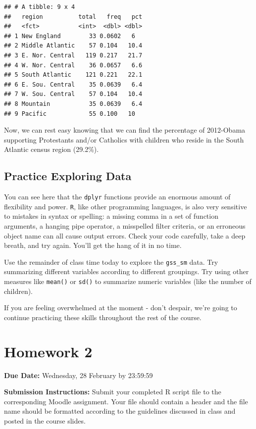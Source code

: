 \documentclass[
]{book}
\begin{document}
\begin{verbatim}
## # A tibble: 9 x 4
##   region          total   freq   pct
##   <fct>           <int>  <dbl> <dbl>
## 1 New England        33 0.0602   6  
## 2 Middle Atlantic    57 0.104   10.4
## 3 E. Nor. Central   119 0.217   21.7
## 4 W. Nor. Central    36 0.0657   6.6
## 5 South Atlantic    121 0.221   22.1
## 6 E. Sou. Central    35 0.0639   6.4
## 7 W. Sou. Central    57 0.104   10.4
## 8 Mountain           35 0.0639   6.4
## 9 Pacific            55 0.100   10
\end{verbatim}

Now, we can rest easy knowing that we can find the percentage of 2012-Obama supporting Protestants and/or Catholics with children who reside in the South Atlantic census region (29.2\%).

\hypertarget{practice-exploring-data}{%
\section{Practice Exploring Data}\label{practice-exploring-data}}

You can see here that the \texttt{dplyr} functions provide an enormous amount of flexibility and power. \texttt{R}, like other programming languages, is also very sensitive to mistakes in syntax or spelling: a missing comma in a set of function arguments, a hanging pipe operator, a misspelled filter criteria, or an erroneous object name can all cause output errors. Check your code carefully, take a deep breath, and try again. You'll get the hang of it in no time.

Use the remainder of class time today to explore the \texttt{gss\_sm} data. Try summarizing different variables according to different groupings. Try using other measures like \texttt{mean()} or \texttt{sd()} to summarize numeric variables (like the number of children).

If you are feeling overwhelmed at the moment - don't despair, we're going to continue practicing these skills throughout the rest of the course.

\hypertarget{homework-2}{%
\chapter*{Homework 2}\label{homework-2}}

\textbf{Due Date:} Wednesday, 28 February by 23:59:59

\textbf{Submission Instructions:} Submit your completed R script file to the corresponding Moodle assignment. Your file should contain a header and the file name should be formatted according to the guidelines discussed in class and posted in the course slides.
\end{document}
